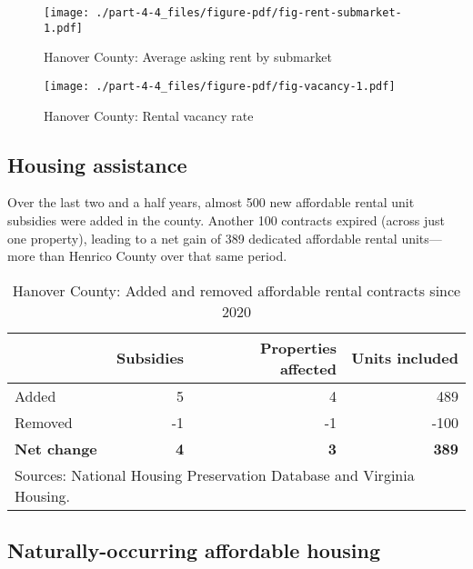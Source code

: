 \documentclass[
  letterpaper,
  DIV=11,
  numbers=noendperiod]{scrreprt}
\begin{document}
\begin{figure}

{\centering \texttt{[image: ./part-4-4\_files/figure-pdf/fig-rent-submarket-1.pdf]}

}

\caption{\label{fig-rent-submarket}Hanover County: Average asking rent
by submarket}

\end{figure}

\begin{figure}

{\centering \texttt{[image: ./part-4-4\_files/figure-pdf/fig-vacancy-1.pdf]}

}

\caption{\label{fig-vacancy}Hanover County: Rental vacancy rate}

\end{figure}

\hypertarget{housing-assistance-3}{%
\subsection{Housing assistance}\label{housing-assistance-3}}

Over the last two and a half years, almost 500 new affordable rental
unit subsidies were added in the county. Another 100 contracts expired
(across just one property), leading to a net gain of 389 dedicated
affordable rental units---more than Henrico County over that same
period.

\hypertarget{tbl-nhpd}{}
\begin{table}
\caption{\label{tbl-nhpd}Hanover County: Added and removed affordable rental contracts since 2020 }\tabularnewline

\centering
\begin{tabular}{l|r|r|r}
\hline
 & Subsidies & Properties affected & Units included\\
\hline
Added & 5 & 4 & 489\\
\hline
Removed & -1 & -1 & -100\\
\hline
\textbf{Net change} & \textbf{4} & \textbf{3} & \textbf{389}\\
\hline
\multicolumn{4}{l}{\rule{0pt}{1em}Sources: National Housing Preservation Database and Virginia Housing.}\\
\end{tabular}
\end{table}

\hypertarget{naturally-occurring-affordable-housing-4}{%
\subsection{Naturally-occurring affordable
housing}\label{naturally-occurring-affordable-housing-4}}
\end{document}
